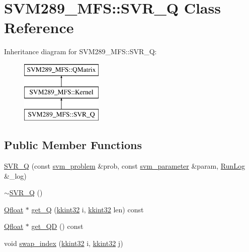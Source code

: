 \hypertarget{class_s_v_m289___m_f_s_1_1_s_v_r___q}{}\section{S\+V\+M289\+\_\+\+M\+FS\+:\+:S\+V\+R\+\_\+Q Class Reference}
\label{class_s_v_m289___m_f_s_1_1_s_v_r___q}
Inheritance diagram for S\+V\+M289\+\_\+\+M\+FS\+:\+:S\+V\+R\+\_\+Q\+:\begin{figure}[H]
\begin{center}
\leavevmode
\includegraphics[height=3.000000cm]{class_s_v_m289___m_f_s_1_1_s_v_r___q}
\end{center}
\end{figure}
\subsection*{Public Member Functions}
\begin{DoxyCompactItemize}
\item 
\hyperlink{class_s_v_m289___m_f_s_1_1_s_v_r___q_a99c364789602f11b2dcf6c700cb5fcd9}{S\+V\+R\+\_\+Q} (const \hyperlink{struct_s_v_m289___m_f_s_1_1svm__problem}{svm\+\_\+problem} \&prob, const \hyperlink{struct_s_v_m289___m_f_s_1_1svm__parameter}{svm\+\_\+parameter} \&param, \hyperlink{class_k_k_b_1_1_run_log}{Run\+Log} \&\+\_\+log)
\item 
\hyperlink{class_s_v_m289___m_f_s_1_1_s_v_r___q_a5a3995fbeaa61ad38794f0a74c4e2e35}{$\sim$\+S\+V\+R\+\_\+Q} ()
\item 
\hyperlink{namespace_s_v_m289___m_f_s_a440663a1b8d42bc10329401883645ae1}{Qfloat} $\ast$ \hyperlink{class_s_v_m289___m_f_s_1_1_s_v_r___q_a630f7efdeba2e60285e96b56e1c4b97b}{get\+\_\+Q} (\hyperlink{namespace_k_k_b_a8fa4952cc84fda1de4bec1fbdd8d5b1b}{kkint32} i, \hyperlink{namespace_k_k_b_a8fa4952cc84fda1de4bec1fbdd8d5b1b}{kkint32} len) const 
\item 
\hyperlink{namespace_s_v_m289___m_f_s_a440663a1b8d42bc10329401883645ae1}{Qfloat} $\ast$ \hyperlink{class_s_v_m289___m_f_s_1_1_s_v_r___q_ad4b93f42c186aede64d73f88e5059375}{get\+\_\+\+QD} () const 
\item 
void \hyperlink{class_s_v_m289___m_f_s_1_1_s_v_r___q_abea243af58ef29037815efe1d1191402}{swap\+\_\+index} (\hyperlink{namespace_k_k_b_a8fa4952cc84fda1de4bec1fbdd8d5b1b}{kkint32} i, \hyperlink{namespace_k_k_b_a8fa4952cc84fda1de4bec1fbdd8d5b1b}{kkint32} j)
\end{DoxyCompactItemize}
